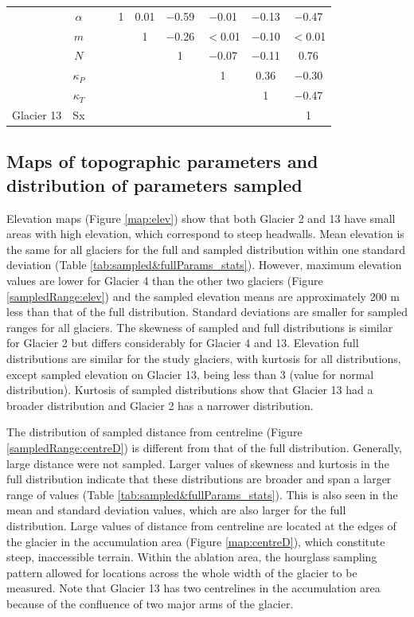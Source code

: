 \documentclass[12pt]{article}
\begin{document}
\begin{table}[H]
\begin{tabular}{cc|cccccccc}
 & $\alpha$ & & & 1 & 0.01 &  $-$0.59 &  $-$0.01 &  $-$0.13 &  $-$0.47 \\
 
 & $m$ & & & & 1 &  $-$0.26 & $<$0.01 &  $-$0.10 &  $<$0.01 \\
 
 & $N$ & & & & & 1 &  $-$0.07 &  $-$0.11 & 0.76 \\
 
 & $\kappa_P$ & & & & & & 1 & 0.36 &  $-$0.30 \\
 
 & $\kappa_T$ & & & & & & & 1 &  $-$0.47 \\
 
\multirow{-8}{*}{Glacier 13} & Sx & & & & & & & & 1
\end{tabular}
\end{table}


\subsection{Maps of topographic parameters and distribution of parameters sampled}


Elevation maps (Figure \ref{map:elev}) show that both Glacier 2 and 13 have small areas with high elevation, which correspond to steep headwalls. Mean elevation is the same for all glaciers for the full and sampled distribution within one standard deviation (Table \ref{tab:sampled&fullParams_stats}). However, maximum elevation values are lower for Glacier 4 than the other two glaciers (Figure \ref{sampledRange:elev}) and the sampled elevation means are approximately 200 m less than that of the full distribution. Standard deviations are smaller for sampled ranges for all glaciers. The skewness of sampled and full distributions is similar for Glacier 2 but differs considerably for Glacier 4 and 13. Elevation full distributions are similar for the study glaciers, with kurtosis for all distributions, except sampled elevation on Glacier 13, being less than 3 (value for normal distribution). Kurtosis of sampled distributions show that Glacier 13 had a broader distribution and Glacier 2 has a narrower distribution. 

The distribution of sampled distance from centreline (Figure \ref{sampledRange:centreD}) is different from that of the full distribution. Generally, large distance were not sampled. Larger values of skewness and kurtosis in the full distribution indicate that these distributions are broader and span a larger range of values (Table \ref{tab:sampled&fullParams_stats}). This is also seen in the mean and standard deviation values, which are also larger for the full distribution. Large values of distance from centreline are located at the edges of the glacier in the accumulation area (Figure \ref{map:centreD}), which constitute steep, inaccessible terrain. Within the ablation area, the hourglass sampling pattern allowed for locations across the whole width of the glacier to be measured. Note that Glacier 13 has two centrelines in the accumulation area because of the confluence of two major arms of the glacier.
\end{document}
